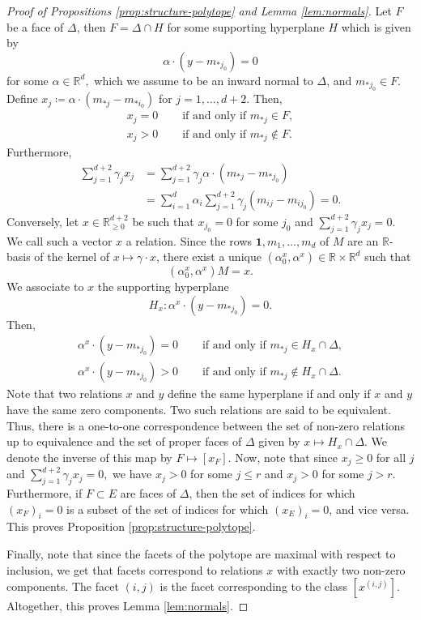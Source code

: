 \documentclass[11pt, reqno]{amsart}
\theoremstyle{plain}
\theoremstyle{definition}
\newcommand{\R}{\mathbb{R}}
\newcommand{\ga}{\gamma}
\newcommand{\al}{\alpha}
\begin{document}
\begin{proof}[Proof of Propositions \ref{prop:structure-polytope} and Lemma \ref{lem:normals}]
Let $F$ be a face of $\Delta$, then $F= \Delta \cap H$ for some supporting hyperplane $H$ which is given by
\[
 \al \cdot (y-m_{*j_0}) =0
\]
for some $\al \in \R^{d},$ which we assume to be an inward normal to $\Delta$, and $m_{*j_0} \in F$. Define $x_j \coloneqq \al \cdot (m_{*j}-m_{*i_0})$ for $j=1,\dots,d+2$. Then,
\begin{align*}
    x_j= 0\quad &\text{ if and only if } m_{*j} \in F, \\
    x_j> 0\quad  &\text{ if and only if } m_{*j} \notin F.
\end{align*}
Furthermore, 
\begin{align*}
\sum_{j=1}^{d+2} \ga_j x_j &= \sum_{j=1}^{d+2} \ga_j \al \cdot (m_{*j}-m_{*j_0})\\
&= \sum_{i=1}^d \al_i \sum_{j=1}^{d+2}  \ga_j (m_{ij}-m_{ij_0})=0.
\end{align*}
Conversely, let $x \in \R^{d+2}_{\ge 0}$ be such that $x_{j_0}=0$ for some $j_0$ and $\sum_{j=1}^{d+2} \ga_jx_j =0$. We call such a vector $x$ a relation. 
Since the rows $\mathbf{1}, m_1,\dots, m_d$ of $M$ are an $\R$-basis of the kernel of $x \mapsto \ga\cdot x$,  there exist a unique $(\al_0^x,\al^x) \in \R\times \R^{d}$ such that
\[
(\al_0^x,\al^{x}) M = x.
\]
We associate to $x$ the supporting hyperplane
\[
H_x:  \al^x \cdot (y-m_{*j_0}) =0.
\]
Then, 
\begin{align*}
    \al^x \cdot (y-m_{*j_0})= 0\quad &\text{ if and only if } m_{*j} \in H_x \cap \Delta, \\
    \al^x \cdot (y-m_{*j_0})>0\quad  &\text{ if and only if } m_{*j} \notin H_x\cap \Delta.
\end{align*}
Note that two relations $x$ and $y$ define the same hyperplane if and only if  $x$ and $y$ have the same zero components. 
Two such relations are said to be equivalent. Thus, there is a one-to-one correspondence between the set of non-zero relations up to equivalence and the set of proper faces of $\Delta$  given by 
$
x \mapsto H_x \cap \Delta.
$
We denote the inverse of this map by $F \mapsto [x_F]$.
Now, note that since $x_j \ge 0$ for all $j$ and $\sum_{j=1}^{d+2} \ga_j x_j =0,$ we have $x_j > 0 $ for some $j \le r$ and $x_j >0$ for some $j >r$.
Furthermore, if $F \subset E$ are faces of $\Delta$, then the set of indices for which $(x_F)_i=0$ is a subset of the set of indices for which $(x_E)_i=0$, and vice versa. This proves Proposition \ref{prop:structure-polytope}.

Finally, note that since the facets of the polytope are maximal with respect to inclusion, we get that facets correspond to relations $x$ with exactly two non-zero components. The facet $(i,j)$ is the facet corresponding to the class $[x^{(i,j)}]$. 
Altogether, this proves Lemma \ref{lem:normals}.
\end{proof}
\end{document}
